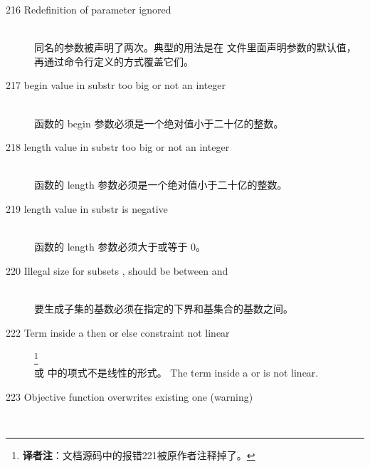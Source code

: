 \begin{description}
\item[216 Redefinition of parameter  ignored]\ \\
  同名的参数被声明了两次。典型的用法是在 \zimpl 
  文件里面声明参数的默认值，再通过命令行定义的方式覆盖它们。
\item[217 begin value  in substr too big or not an integer]\ \\
   函数的 begin 参数必须是一个绝对值小于二十亿的整数。
\item[218 length value  in substr too big or not an integer]\ \\
   函数的 length 参数必须是一个绝对值小于二十亿的整数。
\item[219 length value  in substr is negative]\ \\
   函数的 length 参数必须大于或等于 0。
\item[220 Illegal size for subsets , should be between  
  and ]\ \\
  要生成子集的基数必须在指定的下界和基集合的基数之间。
%
%
\item[222 Term inside a then or else constraint not linear]\footnote{
    \textbf{译者注}：文档源码中的报错221被原作者注释掉了。
  }\ \\
   或  中的项式不是线性的形式。
  The term inside a  or  is not linear.
%
%
\item[223 Objective function  overwrites existing one
  (warning)]\ \\

\end{description}

